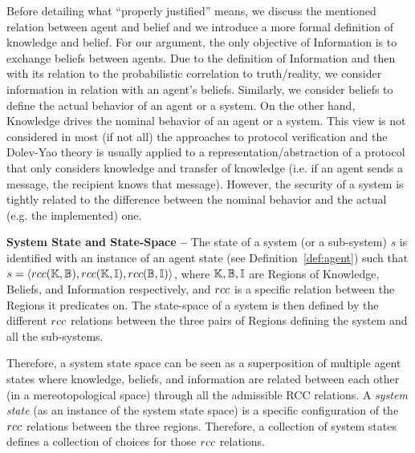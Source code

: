 Before detailing what ``properly justified'' means, we discuss the mentioned
relation between agent and belief and we introduce a more formal definition
of knowledge and belief. For our argument, the only objective of
Information is to exchange beliefs between agents.
Due to the definition of Information and then with its relation to the probabilistic
correlation to truth/reality, we consider
information in relation with an agent's beliefs. Similarly, we consider
beliefs to define the actual behavior of an agent or a system. On the other hand,
Knowledge drives the nominal behavior of an agent or a system. This view
is not considered in most (if not all) the approaches to protocol verification
and the Dolev-Yao theory is usually applied to a representation/abstraction
of a protocol that only considers knowledge and transfer of knowledge (i.e.
if an agent sends a message, the recipient knows that message). However,
the security of a system is tightly related to the difference between
the nominal behavior and the actual (e.g. the implemented) one.

\begin{definition}{\bf System State and State-Space --}\label{def:system}
	The state of a system (or a sub-system) $s$ is identified with an
	instance of an agent state (see Definition~\ref{def:agent}) such that
	$s=\langle rcc(\mathbb{K},\mathbb{B}),rcc(\mathbb{K},\mathbb{I}),rcc(\mathbb{B},\mathbb{I})\rangle$,
	where $\mathbb{K},\mathbb{B},\mathbb{I}$ are Regions
	of Knowledge, Beliefs, and Information respectively, and $rcc$ is a
	specific relation between the Regions it predicates on.  The
	state-space of a system is then defined by the different $rcc$
	relations between the three pairs of Regions defining the system and
	all the sub-systems.
\end{definition}
Therefore, a system state space can be seen as a superposition of multiple agent states where knowledge,
beliefs, and information are related between each other (in a mereotopological
space) through all the admissible RCC relations. 
A \emph{system state} (as an instance of the system state space)
is a specific configuration of
the $rcc$ relations between the three regions. Therefore, a collection of 
system states defines a collection of choices for those $rcc$ relations.


